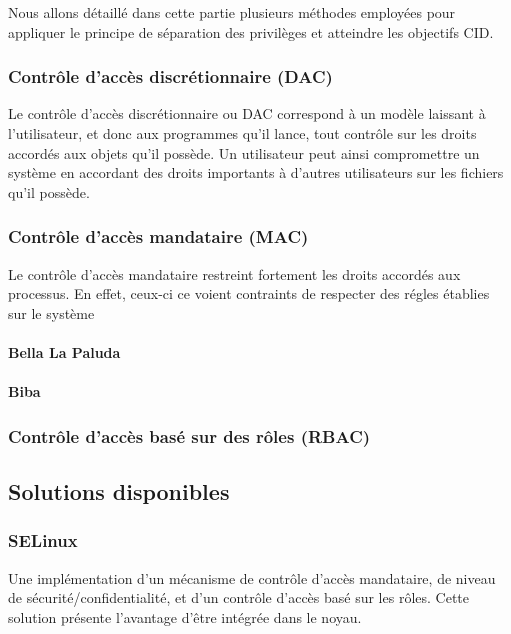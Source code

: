 Nous allons détaillé dans cette partie plusieurs méthodes employées pour appliquer le principe de séparation des privilèges et atteindre les objectifs CID.

\subsubsection{Contrôle d'accès discrétionnaire (DAC)}

Le contrôle d'accès discrétionnaire ou DAC correspond à un modèle laissant à l'utilisateur, et donc aux programmes qu'il lance, tout contrôle sur les droits accordés aux objets qu'il possède. Un utilisateur peut ainsi compromettre un système en accordant des droits importants à d'autres utilisateurs sur les fichiers qu'il possède.

\subsubsection{Contrôle d'accès mandataire (MAC)}

Le contrôle d'accès mandataire restreint fortement les droits accordés aux processus. En effet, ceux-ci ce voient contraints de respecter des régles établies sur le système

\paragraph{Bella La Paluda}

\paragraph{Biba}

\subsubsection{Contrôle d'accès basé sur des rôles (RBAC)}

\subsection{Solutions disponibles}

\subsubsection{SELinux}

Une implémentation d'un mécanisme de contrôle d'accès mandataire, de niveau de sécurité/confidentialité, et d'un contrôle d'accès basé sur les rôles. Cette solution présente l'avantage d'être intégrée dans le noyau.

